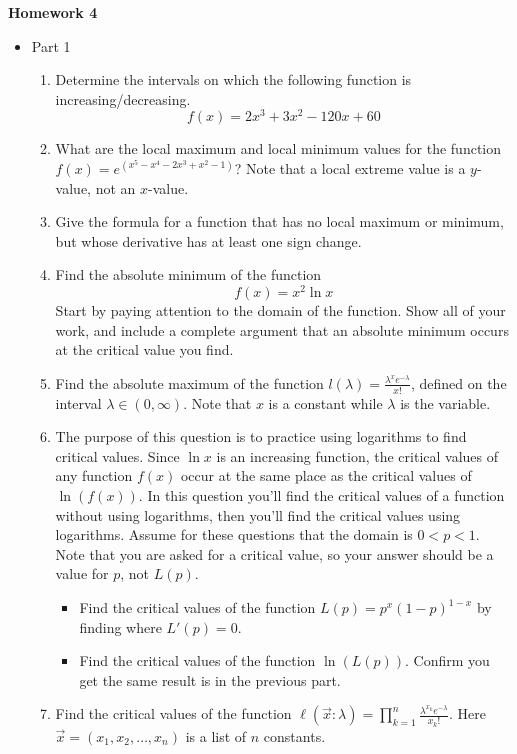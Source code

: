 \documentclass{article}
\begin{document}
 \begin{center}
    \large \textbf{Homework 4}
\end{center}
        \begin{itemize}
            \item Part 1
            \begin{enumerate}
                 \item Determine the intervals on which the following function is increasing/decreasing.  $$f(x)=2x^3+3x^2-120x+60$$
                 \item What are the local maximum and local minimum values for the function $f(x) = e^{(x^5-x^4-2x^3+x^2-1)}$? Note that a local extreme value is a $y$-value, not an $x$-value.
                \item Give the formula for a function that has no local maximum or minimum, but whose derivative has at least one sign change.
                \item Find the absolute minimum of the function 
                $$f(x) = x^2\ln{x}$$
                Start by paying attention to the domain of the function. Show all of your work, and include a complete argument that an absolute minimum occurs at the critical value you find.
                \item Find the absolute maximum of the function $\displaystyle l(\lambda) = \frac{\lambda^xe^{-\lambda}}{x!}$, defined on the interval $\lambda \in (0,\infty)$. Note that $x$ is a constant while $\lambda$ is the variable. 
                \item The purpose of this question is to practice using logarithms to find critical values. Since $\ln{x}$ is an increasing function, the critical values of any function $f(x)$ occur at the same place as the critical values of $\ln{(f(x))}$. In this question you'll find the critical values of a function without using logarithms, then you'll find the critical values using logarithms. Assume for these questions that the domain is $0 < p < 1$. Note that you are asked for a critical value, so your answer should be a value for $p$, not $L(p)$.
                \begin{itemize}
                    \item Find the critical values of the function $L(p) = p^x(1-p)^{1-x}$ by finding where $L'(p) = 0$.
                    \item Find the critical values of the function $\ln{(L(p))}$. Confirm you get the same result is in the previous part.
                \end{itemize} 
                \item Find the critical values of the function $\displaystyle \ell(\vec{x}:\lambda) = \prod_{k=1}^{n} \frac{\lambda^{x_k}e^{-\lambda}}{x_k!}$. Here $\vec{x}=(x_1,x_2,\dots,x_n)$ is a list of $n$ constants.
                

\end{enumerate}
\end{itemize}
\end{document}
